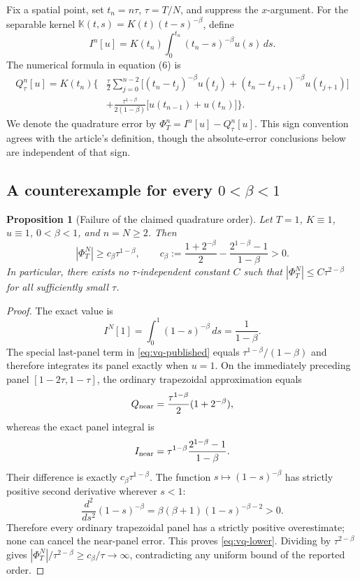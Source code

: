 \documentclass[11pt,a4paper]{amsart}
\theoremstyle{remark}
\theoremstyle{plain}
\newtheorem{proposition}{Proposition}[section]
\theoremstyle{remark}
\numberwithin{equation}{section}
\begin{document}
Fix a spatial point, set $t_n=n\tau$, $\tau=T/N$, and suppress the $x$-argument. For the separable kernel $\mathbb K(t,s)=K(t)(t-s)^{-\beta}$, define
\begin{equation}\label{eq:vq-exact}
 I^n[u]=K(t_n)\int_0^{t_n}(t_n-s)^{-\beta}u(s)\,ds.
\end{equation}
The numerical formula in equation (6) is
\begin{equation}\label{eq:vq-published}
\begin{aligned}
 Q_\tau^n[u]=K(t_n)\Bigg\{&\frac\tau2\sum_{j=0}^{n-2}
 \bigl[(t_n-t_j)^{-\beta}u(t_j)
       +(t_n-t_{j+1})^{-\beta}u(t_{j+1})\bigr]\\
 &+\frac{\tau^{1-\beta}}{2(1-\beta)}
 \bigl[u(t_{n-1})+u(t_n)\bigr]\Bigg\}.
\end{aligned}
\end{equation}
We denote the quadrature error by $\Phi_T^n=I^n[u]-Q_\tau^n[u]$. This sign convention agrees with the article's definition, though the absolute-error conclusions below are independent of that sign.

\subsection{A counterexample for every $0<\beta<1$}
\begin{proposition}[Failure of the claimed quadrature order]\label{prop:vq-counter}
Let $T=1$, $K\equiv1$, $u\equiv1$, $0<\beta<1$, and $n=N\ge2$. Then
\begin{equation}\label{eq:vq-lower}
 |\Phi_T^N|\ge c_\beta\tau^{1-\beta},\qquad
 c_\beta:=\frac{1+2^{-\beta}}2
 -\frac{2^{1-\beta}-1}{1-\beta}>0.
\end{equation}
In particular, there exists no $\tau$-independent constant $C$ such that
$|\Phi_T^N|\le C\tau^{2-\beta}$ for all sufficiently small $\tau$.
\end{proposition}
\begin{proof}
The exact value is
\[
 I^N[1]=\int_0^1(1-s)^{-\beta}\,ds=\frac1{1-\beta}.
\]
The special last-panel term in \eqref{eq:vq-published} equals
$\tau^{1-\beta}/(1-\beta)$ and therefore integrates its panel exactly when $u=1$.
On the immediately preceding panel $[1-2\tau,1-\tau]$, the ordinary trapezoidal approximation equals
\[
 Q_{\rm near}=\frac{\tau^{1-\beta}}2(1+2^{-\beta}),
\]
whereas the exact panel integral is
\[
 I_{\rm near}=\tau^{1-\beta}
 \frac{2^{1-\beta}-1}{1-\beta}.
\]
Their difference is exactly $c_\beta\tau^{1-\beta}$. The function
$s\mapsto(1-s)^{-\beta}$ has strictly positive second derivative wherever $s<1$:
\[
 \frac{d^2}{ds^2}(1-s)^{-\beta}
 =\beta(\beta+1)(1-s)^{-\beta-2}>0.
\]
Therefore every ordinary trapezoidal panel has a strictly positive overestimate; none can cancel the near-panel error. This proves \eqref{eq:vq-lower}.
Dividing by $\tau^{2-\beta}$ gives
$|\Phi_T^N|/\tau^{2-\beta}\ge c_\beta/\tau\to\infty$, contradicting any uniform bound of the reported order.
\end{proof}
\end{document}
